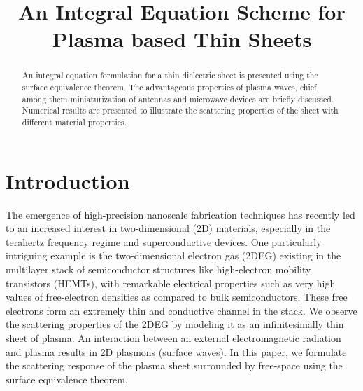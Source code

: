 \documentclass[conference, 10pt]{IEEEtran}
\renewcommand{\^}{\hat}  %
\begin{document}
\title{An Integral Equation Scheme for Plasma based Thin Sheets}


\author{
\and
{}
}
\maketitle


%
\begin{abstract}
  An integral equation formulation for a thin dielectric sheet is presented using the surface equivalence theorem. The advantageous properties of plasma waves, chief among them miniaturization of antennas and microwave devices are briefly discussed. Numerical results are presented to illustrate the scattering properties of the sheet with different material properties.
\end{abstract}

\IEEEpeerreviewmaketitle
\section{Introduction}

The emergence of high-precision nanoscale fabrication techniques has recently led to an increased interest in two-dimensional (2D) materials, especially in the terahertz frequency regime and superconductive devices. One particularly intriguing example is the two-dimensional electron gas (2DEG) existing in the multilayer stack of semiconductor structures like high-electron mobility transistors (HEMTs), with remarkable electrical properties such as very high values of free-electron densities as compared to bulk semiconductors. These free electrons form an extremely thin and conductive channel in the stack. We observe the scattering properties of the 2DEG by modeling it as an infinitesimally thin sheet of plasma. An interaction between an external electromagnetic radiation and plasma results in 2D plasmons (surface waves). In this paper, we formulate the scattering response of the plasma sheet surrounded by free-space using the surface equivalence theorem.
\end{document}
